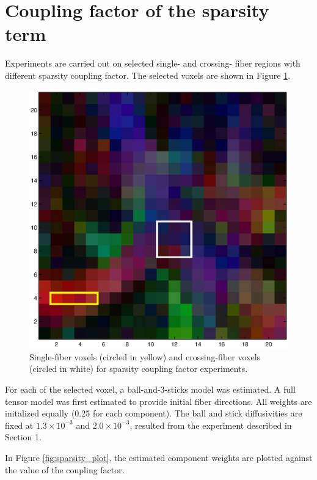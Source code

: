 \documentclass{article}
\begin{document}
\section{Coupling factor of the sparsity term}

Experiments are carried out on selected single- and crossing- fiber regions with different sparsity coupling factor. The selected voxels are shown in Figure \ref{fig:sparsity_roi}.

\begin{figure}[H]
  \centering
  \includegraphics[width=\textwidth]{figures/sparsity_roi.eps}
  \caption{Single-fiber voxels (circled in yellow) and crossing-fiber voxels (circled in white) for sparsity coupling factor experiments.}
  \label{fig:sparsity_roi}
\end{figure}

For each of the selected voxel, a ball-and-3-sticks model was estimated. A full tensor model was first estimated to provide initial fiber directions. All weights are initalized equally (0.25 for each component). The ball and stick diffusivities are fixed at $1.3\times 10^{-3}$ and $2.0\times 10^{-3}$, resulted from the experiment described in Section 1.

In Figure \ref{fig:sparsity_plot}, the estimated component weights are plotted against the value of the coupling factor.
\end{document}
